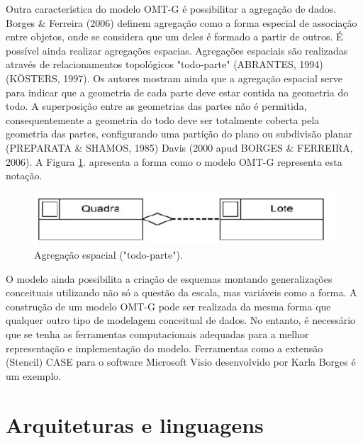 		Outra característica do modelo OMT-G é possibilitar a agregação de dados. Borges \& Ferreira (2006) definem agregação como a forma especial de associação entre objetos, onde se considera que um deles é formado a partir de outros. É possível ainda realizar agregações espacias. Agregações espaciais são realizadas através de relacionamentos topológicos "todo-parte" (ABRANTES, 1994)\cite{ABRANTES} (KÖSTERS, 1997)\cite{KOSTERS_etal97}. Os autores mostram ainda que a agregação espacial  serve para indicar que a geometria de cada parte deve estar contida na geometria do todo. A superposição entre as geometrias das partes não é permitida, consequentemente a geometria do todo deve ser totalmente coberta pela geometria das partes, configurando uma partição do plano ou subdivisão planar (PREPARATA \& SHAMOS, 1985)\cite{PREPARATA_SHAMOS} Davis (2000\cite{DAVIS} apud BORGES \& FERREIRA, 2006\cite{BORGES_etal05}). A Figura \ref{fig:agregacaoespacial}. apresenta a forma como o modelo OMT-G representa esta notação. 
		
		\begin{figure} [h]
			\centering
			\includegraphics[width=1\linewidth]{data/agregacao_espacial}
			\caption{Agregação espacial ("todo-parte"). \cite{BORGES_etal05}}
			\label{fig:agregacaoespacial}
		\end{figure}
		
		O modelo ainda possibilita a criação de esquemas montando generalizações conceituais utilizando não só a questão da escala, mas variáveis como a forma. A construção de um modelo OMT-G pode ser realizada da mesma forma que qualquer outro tipo de modelagem conceitual de dados. No entanto, é necessário que se tenha as ferramentas computacionais adequadas para a melhor representação e implementação do modelo. Ferramentas como a extensão (Stencil) CASE para o software Microsoft Visio desenvolvido por Karla Borges é um exemplo.  
		
		\section{Arquiteturas e linguagens}
		
